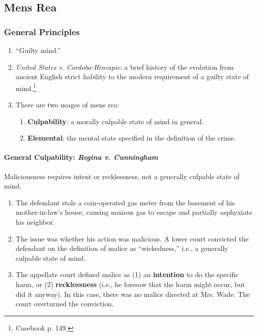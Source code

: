 \subsection{Mens Rea}

\subsubsection{General Principles}

\begin{enumerate}
    \item ``Guilty mind.''
    \item \emph{United States v. Cordoba-Hincapie}: a brief history of the 
    evolution from ancient English strict liability to the modern requirement 
    of a guilty state of mind.\footnote{Casebook p. 149.}
    \item There are two usages of mens rea:
    \begin{enumerate}
        \item \textbf{Culpability}: a morally culpable state of mind in 
        general.
        \item \textbf{Elemental}: the mental state specified in the definition 
        of the crime.
    \end{enumerate}
\end{enumerate}

\paragraph{General Culpability: \emph{Regina v. Cunningham}}

Maliciousness requires intent or recklessness, not a generally culpable state 
of mind.

\begin{enumerate}
    \item The defendant stole a coin-operated gas meter from the basement of 
    his mother-in-law's house, causing noxious gas to escape and partially 
    asphyxiate his neighbor.
    \item The issue was whether his action was malicious. A lower court 
    convicted the defendant on the definition of malice as ``wickedness,'' 
    i.e., a generally culpable state of mind.
    \item The appellate court defined malice as (1) an \textbf{intention} to 
    do the specific harm, or (2) \textbf{recklessness} (i.e., he foresaw that 
    the harm might occur, but did it anyway). In this case, there was no 
    malice directed at Mrs. Wade. The court overturned the conviction.
\end{enumerate}

